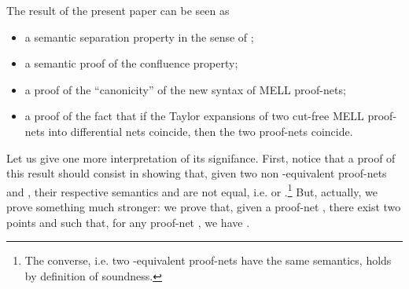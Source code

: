 \documentclass{article}
\theoremstyle{plain}
\begin{document}
The result of the present paper can be seen as
\begin{itemize}
\item a semantic separation property in the sense of \cite{Friedman};
\item a semantic proof of the confluence property;
\item a proof of the ``canonicity'' of the new syntax of MELL proof-nets;
\item a proof of the fact that if the Taylor expansions of two cut-free MELL proof-nets into differential nets \cite{EhrhardRegnier:DiffNets} coincide, then the two proof-nets coincide.
\end{itemize}
\begin{comment}
The relational semantics is very important for Linear Logic:\begin{itemize}
\item the interpretations of the proofs in the relational model are the same ones as in the non-uniform coherence semantics (\cite{bucciarelliehrhard01, Boudes11}) and in the category of weighted sets (\cite{classicalPCF});
\item we can closely relate the size of the points of the interpretations of the proof-nets in the relational model with the execution time of the proof-nets (\cite{phddecarvalho}, \cite{Carvalhoexecution} and \cite{CarvPagTdF10});
\item the relational semantics is a denotational semantics for differential nets \cite{EhrhardRegnier:DiffNets};\footnote{This is not the case with the coherence semantics.} these ones can be seen as a refinement of Linear Logic - the translation from LL proof-nets into differential nets is the Taylor expansion.
\end{itemize}
\end{comment}


Let us give one more interpretation of its signifance. First, notice that a proof of this result should consist in showing that, given two non -equivalent proof-nets  and , their respective semantics  and  are not equal, i.e.  or .\footnote{The converse, i.e. two -equivalent proof-nets have the same semantics, holds by definition of soundness.} But, actually, we prove something much stronger: we prove that, given a proof-net , there exist two points  and  such that, for any proof-net , we have . 
\end{document}
